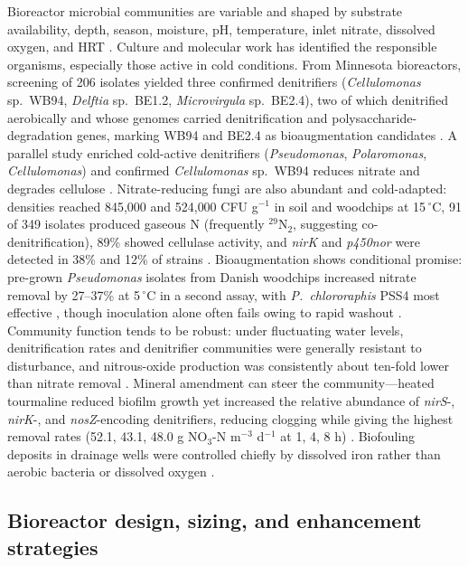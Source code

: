 \documentclass[11pt]{article}
\begin{document}
Bioreactor microbial communities are variable and shaped by substrate availability, depth, season, moisture, pH, temperature, inlet nitrate, dissolved oxygen, and HRT \parencite{Hartfiel2022}. Culture and molecular work has identified the responsible organisms, especially those active in cold conditions. From Minnesota bioreactors, screening of 206 isolates yielded three confirmed denitrifiers (\textit{Cellulomonas} sp.\ WB94, \textit{Delftia} sp.\ BE1.2, \textit{Microvirgula} sp.\ BE2.4), two of which denitrified aerobically and whose genomes carried denitrification and polysaccharide-degradation genes, marking WB94 and BE2.4 as bioaugmentation candidates \parencite{Anderson2020}. A parallel study enriched cold-active denitrifiers (\textit{Pseudomonas}, \textit{Polaromonas}, \textit{Cellulomonas}) and confirmed \textit{Cellulomonas} sp.\ WB94 reduces nitrate and degrades cellulose \parencite{Jang2019}. Nitrate-reducing fungi are also abundant and cold-adapted: densities reached 845{,}000 and 524{,}000 CFU g$^{-1}$ in soil and woodchips at 15\,$^{\circ}$C, 91 of 349 isolates produced gaseous N (frequently $^{29}$N$_2$, suggesting co-denitrification), 89\% showed cellulase activity, and \textit{nirK} and \textit{p450nor} were detected in 38\% and 12\% of strains \parencite{Aldossari2021}. Bioaugmentation shows conditional promise: pre-grown \textit{Pseudomonas} isolates from Danish woodchips increased nitrate removal by 27--37\% at 5\,$^{\circ}$C in a second assay, with \textit{P.\ chlororaphis} PSS4 most effective \parencite{Jeglot2022}, though inoculation alone often fails owing to rapid washout \parencite{Wang2025b}. Community function tends to be robust: under fluctuating water levels, denitrification rates and denitrifier communities were generally resistant to disturbance, and nitrous-oxide production was consistently about ten-fold lower than nitrate removal \parencite{Hathaway2017}. Mineral amendment can steer the community---heated tourmaline reduced biofilm growth yet increased the relative abundance of \textit{nirS}-, \textit{nirK}-, and \textit{nosZ}-encoding denitrifiers, reducing clogging while giving the highest removal rates (52.1, 43.1, 48.0 g NO$_3$-N m$^{-3}$ d$^{-1}$ at 1, 4, 8 h) \parencite{Ma2021}. Biofouling deposits in drainage wells were controlled chiefly by dissolved iron rather than aerobic bacteria or dissolved oxygen \parencite{Stuetz2004}.

\subsection{Bioreactor design, sizing, and enhancement strategies}
\end{document}
